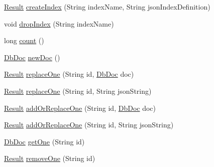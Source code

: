 \begin{DoxyCompactItemize}
\item 
\mbox{\hyperlink{interfacecom_1_1mysql_1_1cj_1_1xdevapi_1_1_result}{Result}} \mbox{\hyperlink{interfacecom_1_1mysql_1_1cj_1_1xdevapi_1_1_collection_a2de7cddb075e95bfb3b880cb58fe703f}{create\+Index}} (String index\+Name, String json\+Index\+Definition)
\item 
void \mbox{\hyperlink{interfacecom_1_1mysql_1_1cj_1_1xdevapi_1_1_collection_a148bfe19c511fac4e0117d596fd08aa4}{drop\+Index}} (String index\+Name)
\item 
long \mbox{\hyperlink{interfacecom_1_1mysql_1_1cj_1_1xdevapi_1_1_collection_a515922bba92c3d82c776095a2692dcd2}{count}} ()
\item 
\mbox{\hyperlink{interfacecom_1_1mysql_1_1cj_1_1xdevapi_1_1_db_doc}{Db\+Doc}} \mbox{\hyperlink{interfacecom_1_1mysql_1_1cj_1_1xdevapi_1_1_collection_a3f57db07e47da44f25e96c70b301fac1}{new\+Doc}} ()
\item 
\mbox{\hyperlink{interfacecom_1_1mysql_1_1cj_1_1xdevapi_1_1_result}{Result}} \mbox{\hyperlink{interfacecom_1_1mysql_1_1cj_1_1xdevapi_1_1_collection_a7c5c6cf51afb021bd225926bd22a3c67}{replace\+One}} (String id, \mbox{\hyperlink{interfacecom_1_1mysql_1_1cj_1_1xdevapi_1_1_db_doc}{Db\+Doc}} doc)
\item 
\mbox{\hyperlink{interfacecom_1_1mysql_1_1cj_1_1xdevapi_1_1_result}{Result}} \mbox{\hyperlink{interfacecom_1_1mysql_1_1cj_1_1xdevapi_1_1_collection_a618e9acc463938e78aaa0be592204060}{replace\+One}} (String id, String json\+String)
\item 
\mbox{\hyperlink{interfacecom_1_1mysql_1_1cj_1_1xdevapi_1_1_result}{Result}} \mbox{\hyperlink{interfacecom_1_1mysql_1_1cj_1_1xdevapi_1_1_collection_a5b6db06712b9a26fa1f33860ad37301f}{add\+Or\+Replace\+One}} (String id, \mbox{\hyperlink{interfacecom_1_1mysql_1_1cj_1_1xdevapi_1_1_db_doc}{Db\+Doc}} doc)
\item 
\mbox{\hyperlink{interfacecom_1_1mysql_1_1cj_1_1xdevapi_1_1_result}{Result}} \mbox{\hyperlink{interfacecom_1_1mysql_1_1cj_1_1xdevapi_1_1_collection_adf42b24e9ac93397cdd86f485ac93919}{add\+Or\+Replace\+One}} (String id, String json\+String)
\item 
\mbox{\hyperlink{interfacecom_1_1mysql_1_1cj_1_1xdevapi_1_1_db_doc}{Db\+Doc}} \mbox{\hyperlink{interfacecom_1_1mysql_1_1cj_1_1xdevapi_1_1_collection_afbb44f5ae7c315f07d02a22abfc5a204}{get\+One}} (String id)
\item 
\mbox{\hyperlink{interfacecom_1_1mysql_1_1cj_1_1xdevapi_1_1_result}{Result}} \mbox{\hyperlink{interfacecom_1_1mysql_1_1cj_1_1xdevapi_1_1_collection_a60a716403dff168734c61966dccf016c}{remove\+One}} (String id)
\end{DoxyCompactItemize}


